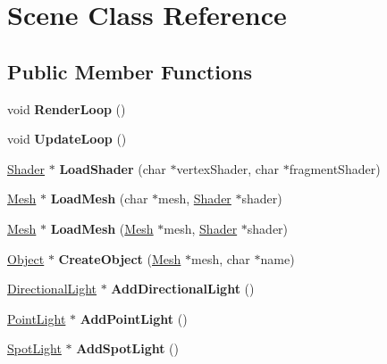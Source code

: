\hypertarget{class_scene}{}\section{Scene Class Reference}
\label{class_scene}
\subsection*{Public Member Functions}
\begin{DoxyCompactItemize}
\item 
\mbox{\label{class_scene_a71708279f69885e838e288c6689ddd1c}} 
void {\bfseries Render\+Loop} ()
\item 
\mbox{\label{class_scene_ab0293e9c900f18ce4ca26621d4b7ddfe}} 
void {\bfseries Update\+Loop} ()
\item 
\mbox{\label{class_scene_a6f0f7af3d07acbee2d6864c3ded98351}} 
\hyperlink{class_shader}{Shader} $\ast$ {\bfseries Load\+Shader} (char $\ast$vertex\+Shader, char $\ast$fragment\+Shader)
\item 
\mbox{\label{class_scene_a660e1d1c0aebaff994ea6d36d1e9fec5}} 
\hyperlink{class_mesh}{Mesh} $\ast$ {\bfseries Load\+Mesh} (char $\ast$mesh, \hyperlink{class_shader}{Shader} $\ast$shader)
\item 
\mbox{\label{class_scene_a676cf764adad1d7e30311582ccae2b7e}} 
\hyperlink{class_mesh}{Mesh} $\ast$ {\bfseries Load\+Mesh} (\hyperlink{class_mesh}{Mesh} $\ast$mesh, \hyperlink{class_shader}{Shader} $\ast$shader)
\item 
\mbox{\label{class_scene_adfdea29bf0ed9107c28f99fb8ebe34d1}} 
\hyperlink{class_object}{Object} $\ast$ {\bfseries Create\+Object} (\hyperlink{class_mesh}{Mesh} $\ast$mesh, char $\ast$name)
\item 
\mbox{\label{class_scene_a8ba56754e230d7a99736c5232bd912ea}} 
\hyperlink{class_directional_light}{Directional\+Light} $\ast$ {\bfseries Add\+Directional\+Light} ()
\item 
\mbox{\label{class_scene_ac33b9cc536096a447892f524802dd2ec}} 
\hyperlink{class_point_light}{Point\+Light} $\ast$ {\bfseries Add\+Point\+Light} ()
\item 
\mbox{\label{class_scene_a5086a9e37b94c2dfb30dfacbee668c79}} 
\hyperlink{class_spot_light}{Spot\+Light} $\ast$ {\bfseries Add\+Spot\+Light} ()
\end{DoxyCompactItemize}
